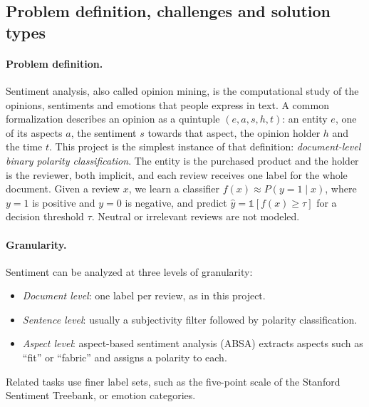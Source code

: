 \subsection{Problem definition, challenges and solution types}\label{sec:problem}

\paragraph{Problem definition.}
Sentiment analysis, also called opinion mining, is the computational study of the opinions, sentiments and emotions that people express in text\cite{wankhade2022survey}.
A common formalization describes an opinion as a quintuple $(e, a, s, h, t)$: an entity $e$, one of its aspects $a$, the sentiment $s$ towards that aspect, the opinion holder $h$ and the time $t$.
This project is the simplest instance of that definition: \emph{document-level binary polarity classification}.
The entity is the purchased product and the holder is the reviewer, both implicit, and each review receives one label for the whole document.
Given a review $x$, we learn a classifier $f(x) \approx P(y{=}1 \mid x)$, where $y=1$ is positive and $y=0$ is negative, and predict $\hat y = \mathbb{1}[f(x) \ge \tau]$ for a decision threshold $\tau$.
Neutral or irrelevant reviews are not modeled.

\paragraph{Granularity.}
Sentiment can be analyzed at three levels of granularity:
\begin{itemize}
  \item \emph{Document level}: one label per review, as in this project.
  \item \emph{Sentence level}: usually a subjectivity filter followed by polarity classification.
  \item \emph{Aspect level}: aspect-based sentiment analysis (ABSA) extracts aspects such as ``fit'' or ``fabric'' and assigns a polarity to each\cite{zhang2023absa}.
\end{itemize}
Related tasks use finer label sets, such as the five-point scale of the Stanford Sentiment Treebank, or emotion categories.

